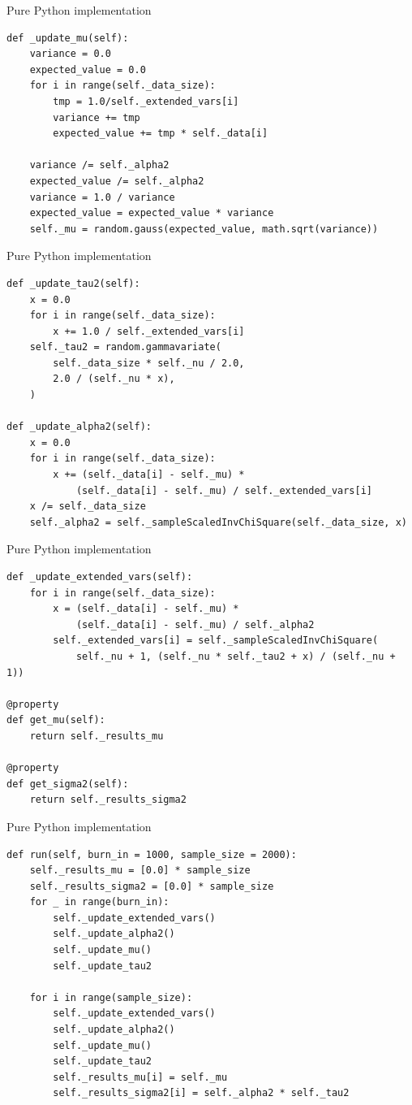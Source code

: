 \documentclass[8pt]{beamer}
\begin{document}
\begin{frame}[fragile]{Pure Python implementation}
\begin{verbatim}
def _update_mu(self):
	variance = 0.0
	expected_value = 0.0
	for i in range(self._data_size):
		tmp = 1.0/self._extended_vars[i]
		variance += tmp
		expected_value += tmp * self._data[i]

	variance /= self._alpha2
	expected_value /= self._alpha2
	variance = 1.0 / variance
	expected_value = expected_value * variance
	self._mu = random.gauss(expected_value, math.sqrt(variance))
\end{verbatim}
\end{frame}

\begin{frame}[fragile]{Pure Python implementation}
\begin{verbatim}
def _update_tau2(self):
	x = 0.0
	for i in range(self._data_size):
		x += 1.0 / self._extended_vars[i]
	self._tau2 = random.gammavariate(
		self._data_size * self._nu / 2.0, 
		2.0 / (self._nu * x),
	)

def _update_alpha2(self):
	x = 0.0
	for i in range(self._data_size):
		x += (self._data[i] - self._mu) * 
			(self._data[i] - self._mu) / self._extended_vars[i]
	x /= self._data_size
	self._alpha2 = self._sampleScaledInvChiSquare(self._data_size, x)
\end{verbatim}
\end{frame}

\begin{frame}[fragile]{Pure Python implementation}
\begin{verbatim}
def _update_extended_vars(self):
	for i in range(self._data_size):
		x = (self._data[i] - self._mu) * 
			(self._data[i] - self._mu) / self._alpha2
		self._extended_vars[i] = self._sampleScaledInvChiSquare(
			self._nu + 1, (self._nu * self._tau2 + x) / (self._nu + 1))

@property
def get_mu(self):
	return self._results_mu

@property
def get_sigma2(self):
	return self._results_sigma2
\end{verbatim}
\end{frame}

\begin{frame}[fragile]{Pure Python implementation}
\begin{verbatim}
def run(self, burn_in = 1000, sample_size = 2000):
	self._results_mu = [0.0] * sample_size
	self._results_sigma2 = [0.0] * sample_size
	for _ in range(burn_in):	
		self._update_extended_vars()
		self._update_alpha2()
		self._update_mu()
		self._update_tau2

	for i in range(sample_size):	
		self._update_extended_vars()
		self._update_alpha2()
		self._update_mu()
		self._update_tau2
		self._results_mu[i] = self._mu
		self._results_sigma2[i] = self._alpha2 * self._tau2
\end{verbatim}
\end{frame}
\end{document}
